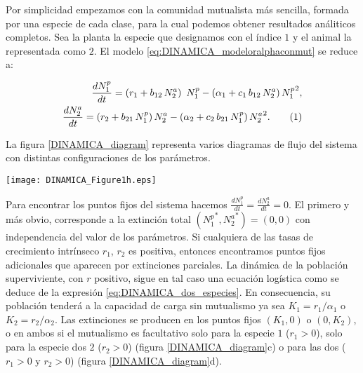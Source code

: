 Por simplicidad empezamos con la comunidad mutualista más sencilla, formada por una especie de cada clase, para la cual podemos obtener resultados análiticos completos. Sea la planta la especie que designamos con el índice $1$ y el animal la representada como $2$. El modelo \ref{eq:DINAMICA_modeloralphaconmut} se reduce a:

\begin{align}
\frac{dN^p_{1}}{dt} = \left( r_{1}+ b_{12}\, N^a_{2}\right) \ N^p_{1} - \left(\alpha_{1}+ c_{1} \, b_{12} \, N^a_{2} \right) {N^p_{1}}^2 ,\nonumber\\ 
\frac{dN^a_{2}}{dt} = \left( r_{2}+ b_{21}\, N^p_{1}\right)N^a_{2} - \left(\alpha_{2}+ c_{2} \, b_{21}\, N^p_{1} \right) {N^a_{2}}^2 .
\stepcounter{equation}\tag{\theequation}\label{eq:DINAMICA_dos_especies}
\end{align}

La figura \ref{DINAMICA_diagram} representa varios diagramas de flujo del sistema con distintas configuraciones de los parámetros.

\begin{figure*}
\centering
\texttt{[image: DINAMICA\_Figure1h.eps]}
\caption {Diagrama de flujo de la dinámica de una comunidad de dos especies según el modelo de ecuaciones \ref{eq:DINAMICA_dos_especies}. Los puntos fijos se han resaltado como círculos de color rojo. El color de las flechas indica la intensidad del flujo. Las cuatro imágenes corresponden a diferentes valores para las tasas intrínsecas de crecimimento. El resto de parámetros mantiene los mismos valores en los cuatro casos: $\alpha_1 = \alpha_2 = 0.008$, $b_{12} = b_{21} = 0.4$ y $c_1 = c_2 = 0.008$. El mutualismo es obligatorio en a) y b), aunque en diferente grado en el segundo diagrama. Es obligatorio para la especie 2 es c), mientras que la especie 1 podría sobrevivir sin la 2. En d) el mutualismo es facultativo para ambas especies.}
\label{DINAMICA_diagram}
\end{figure*}

Para encontrar los puntos fijos del sistema hacemos $\frac{dN^p_{1}}{dt} = \frac{dN^a_{2}}{dt} = 0$. El primero y más obvio, corresponde a la extinción total $({N^p_{1}}^*,{N^a_{2}}^*) = (0,0)$ con independencia del valor de los parámetros. Si cualquiera de las tasas de crecimiento intrínseco $r_1$, $r_2$ es positiva, entonces encontramos puntos fijos adicionales que aparecen por extinciones parciales. La dinámica de la población superviviente, con $r$ positivo, sigue en tal caso una ecuación logística como se deduce de la expresión \ref{eq:DINAMICA_dos_especies}. En consecuencia, su población tenderá a la capacidad de carga sin mutualismo ya sea $K_1 = r_1/\alpha_1$ o $K_2 = r_2/\alpha_2$. Las extinciones se producen en los puntos fijos $(K_1,0)$ o $(0,K_2)$, o en ambos si el mutualismo es facultativo solo para la especie $1$ ($r_1 >0$), solo para la especie dos $2$ ($r_2 >0$) (figura \ref{DINAMICA_diagram}c) o para las dos ($r_1>0$ y $r_2 >0$) (figura \ref{DINAMICA_diagram}d). 

